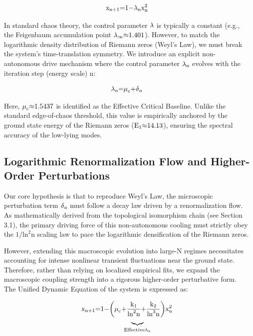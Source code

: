 \documentclass[fleqn,10pt]{wlscirep}
\begin{document}
\[\text{x}_{\text{n}\text{+1}}\text{=1\ensuremath{-}}\text{\ensuremath{\lambda}}_{\text{n}}\text{x}_{\text{n}}^{\text{2}}\]

In standard chaos theory, the control parameter \(\text{\ensuremath{\lambda}}\) is
typically a constant (e.g., the Feigenbaum accumulation point
\(\text{\ensuremath{\lambda}}_{\text{\ensuremath{\infty}}}\text{\ensuremath{\approx}1.401}\)). However, to match the logarithmic
density distribution of Riemann zeros (Weyl's Law), we must break the
system's time-translation symmetry. We introduce an explicit
non-autonomous drive mechanism where the control parameter
\(\text{\ensuremath{\lambda}}_{\text{n}}\) evolves with the iteration step (energy scale)
\(\text{n}\):

\[\text{\ensuremath{\lambda}}_{\text{n}}\text{=}\text{\ensuremath{\mu}}_{\text{c}}\text{+}\text{\ensuremath{\delta}}_{\text{n}}\]

Here, \(\text{\ensuremath{\mu}}_{\text{c}}\text{\ensuremath{\approx}1.5437}\) is identified as the
Effective Critical Baseline. Unlike the standard edge-of-chaos
threshold, this value is empirically anchored by the ground state energy
of the Riemann zeros (\(\text{E}_{\text{1}}\text{\ensuremath{\approx}14.13}\)), ensuring
the spectral accuracy of the low-lying modes.

\subsection*{Logarithmic Renormalization Flow and Higher-Order Perturbations}

Our core hypothesis is that to reproduce Weyl's Law, the microscopic
perturbation term \(\text{\ensuremath{\delta}}_{\text{n}}\) must follow a decay law driven
by a renormalization flow. As mathematically derived from the
topological isomorphism chain (see Section 3.1), the primary driving
force of this non-autonomous cooling must strictly obey the
\(\text{1/}\text{ln}^{\text{2}}\text{n}\) scaling law to pace the
logarithmic densification of the Riemann zeros.

However, extending this macroscopic evolution into large-N regimes
necessitates accounting for intense nonlinear transient fluctuations
near the ground state. Therefore, rather than relying on localized
empirical fits, we expand the macroscopic coupling strength into a
rigorous higher-order perturbative form. The Unified Dynamic Equation of
the system is expressed as:

\[\text{x}_{\text{n}\text{+1}}\text{=1\ensuremath{-}}\underset{\text{Effective}\text{\ensuremath{\lambda}}_{\text{n}}}{\underset{\text{\ensuremath{\underbrace{\phantom{x}}}}}{\left( \text{\ensuremath{\mu}}_{\text{c}}\text{+}\frac{\text{k}_{\text{1}}}{\text{ln}^{\text{2}}\text{n}}\text{+}\frac{\text{k}_{\text{2}}}{\text{ln}^{\text{3}}\text{n}} \right)}}\text{x}_{\text{n}}^{\text{2}}\]
\end{document}
